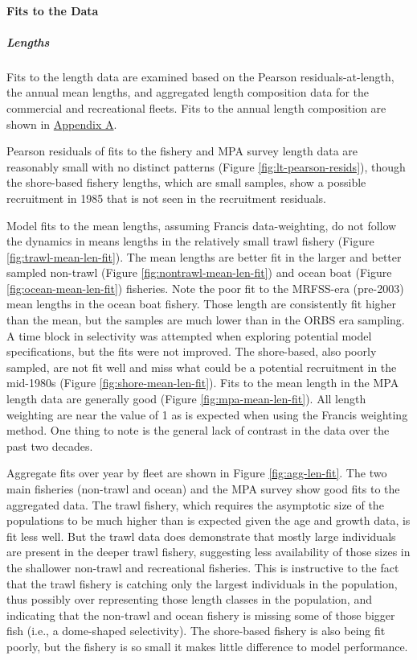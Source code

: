 \documentclass[11pt,
  english,
  letterpaper,
]{article}
\begin{document}
\hypertarget{fits-to-the-data}{%
\paragraph{Fits to the Data}\label{fits-to-the-data}}

\hypertarget{lengths}{%
\subparagraph{Lengths}\label{lengths}}

Fits to the length data are examined based on the Pearson residuals-at-length, the annual mean lengths, and aggregated length composition data for the commercial and recreational fleets. Fits to the annual length composition are shown in \protect\hyperlink{app_a}{Appendix A}.

Pearson residuals of fits to the fishery and MPA survey length data are reasonably small with no distinct patterns (Figure \ref{fig:lt-pearson-resids}), though the shore-based fishery lengths, which are small samples, show a possible recruitment in 1985 that is not seen in the recruitment residuals.

Model fits to the mean lengths, assuming Francis data-weighting, do not follow the dynamics in means lengths in the relatively small trawl fishery (Figure \ref{fig:trawl-mean-len-fit}). The mean lengths are better fit in the larger and better sampled non-trawl (Figure \ref{fig:nontrawl-mean-len-fit}) and ocean boat (Figure \ref{fig:ocean-mean-len-fit}) fisheries. Note the poor fit to the MRFSS-era (pre-2003) mean lengths in the ocean boat fishery. Those length are consistently fit higher than the mean, but the samples are much lower than in the ORBS era sampling. A time block in selectivity was attempted when exploring potential model specifications, but the fits were not improved. The shore-based, also poorly sampled, are not fit well and miss what could be a potential recruitment in the mid-1980s (Figure \ref{fig:shore-mean-len-fit}). Fits to the mean length in the MPA length data are generally good (Figure \ref{fig:mpa-mean-len-fit}). All length weighting are near the value of 1 as is expected when using the Francis weighting method. One thing to note is the general lack of contrast in the data over the past two decades.

Aggregate fits over year by fleet are shown in Figure \ref{fig:agg-len-fit}. The two main fisheries (non-trawl and ocean) and the MPA survey show good fits to the aggregated data. The trawl fishery, which requires the asymptotic size of the populations to be much higher than is expected given the age and growth data, is fit less well. But the trawl data does demonstrate that mostly large individuals are present in the deeper trawl fishery, suggesting less availability of those sizes in the shallower non-trawl and recreational fisheries. This is instructive to the fact that the trawl fishery is catching only the largest individuals in the population, thus possibly over representing those length classes in the population, and indicating that the non-trawl and ocean fishery is missing some of those bigger fish (i.e., a dome-shaped selectivity). The shore-based fishery is also being fit poorly, but the fishery is so small it makes little difference to model performance.
\end{document}
